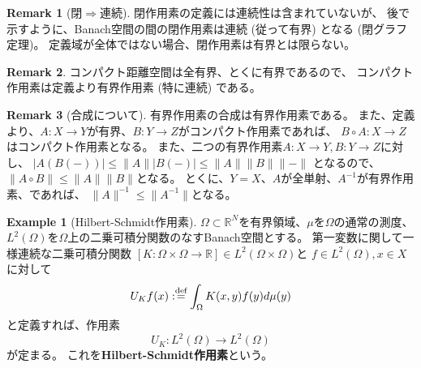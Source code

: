 \documentclass[uplatex]{jsarticle}
\theoremstyle{definition}
\newtheorem{rem}[rem]{Remark}
\newtheorem{exam}[exam]{Example}
\newcommand{\ep}{\varepsilon}
\newcommand{\dfn}{:\overset{\mbox{{\scriptsize def}}}{=}}
\newcommand{\R}{\mathbb{R}}
\begin{document}
\begin{rem}[閉\(\Rightarrow\)連続]
  閉作用素の定義には連続性は含まれていないが、
  後で示すように、Banach空間の間の閉作用素は連続 (従って有界) となる
  (閉グラフ定理)。
  定義域が全体ではない場合、閉作用素は有界とは限らない。
\end{rem}




\begin{rem}
  コンパクト距離空間は全有界、とくに有界であるので、
  コンパクト作用素は定義より有界作用素 (特に連続) である。
\end{rem}




\begin{rem}[合成について]
  \label{rem: comp}
  有界作用素の合成は有界作用素である。
  また、定義より、\(A:X\to Y\)が有界、\(B:Y\to Z\)がコンパクト作用素であれば、
  \(B\circ A:X\to Z\)はコンパクト作用素となる。
  また、二つの有界作用素\(A:X\to Y,B:Y\to Z\)に対し、
  \(|A(B(-))|\leq \|A\||B(-)| \leq \|A\|\|B\|\|-\|\)
  となるので、\(\|A\circ B\| \leq \|A\|\|B\|\)となる。
  とくに、\(Y=X\)、\(A\)が全単射、\(A^{-1}\)が有界作用素、であれば、
  \(\|A\|^{-1}\leq \|A^{-1}\|\)となる。
\end{rem}





\begin{exam}[Hilbert-Schmidt作用素]
  \(\Omega\subset \R^N\)を有界領域、\(\mu\)を\(\Omega\)の通常の測度、
  \(L^2(\Omega)\)を\(\Omega\)上の二乗可積分関数のなすBanach空間とする。
  第一変数に関して一様連続な二乗可積分関数
  \([K:\Omega\times\Omega\to \R]\in L^2(\Omega\times\Omega)\)と
  \(f\in L^2(\Omega),x\in X\)に対して
  \[U_Kf(x) \dfn \int_{\Omega}K(x,y)f(y)d\mu(y)\]
  と定義すれば、作用素
  \[
  U_K: L^2(\Omega)\to L^2(\Omega)
  \]
  が定まる。
  これを\textbf{Hilbert-Schmidt作用素}という。
%
\end{exam}
\end{document}
